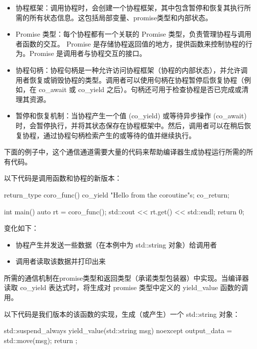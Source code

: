 \begin{itemize}
\item
协程框架：调用协程时，会创建一个协程框架，其中包含暂停和恢复其执行所需的所有状态信息。这包括局部变量、promise类型和内部状态。

\item
Promise 类型：每个协程都有一个关联的 Promise 类型，负责管理协程与调用者函数的交互。 Promise 是存储协程返回值的地方，提供函数来控制协程的行为。Promise 是调用者与协程交互的接口。

\item
协程句柄：协程句柄是一种允许访问协程框架（协程的内部状态），并允许调用者恢复或销毁协程的类型。调用者可以使用句柄在协程暂停后恢复协程（例如，在 co\_await 或 co\_yield 之后）。句柄还可用于检查协程是否已完成或清理其资源。

\item
暂停和恢复机制：当协程产生一个值 (co\_yield) 或等待异步操作 (co\_await) 时，会暂停执行，并将其状态保存在协程框架中。然后，调用者可以在稍后恢复协程，通过协程句柄检索产生的或等待的值并继续执行。
\end{itemize}

下面的例子中，这个通信通道需要大量的代码来帮助编译器生成协程运行所需的所有代码。

以下代码是调用函数和协程的新版本：

\begin{cpp}
return_type coro_func() {
    co_yield "Hello from the coroutine\n"s;
    co_return;
}

int main() {
    auto rt = coro_func();
    std::cout << rt.get() << std::endl;
    return 0;
}
\end{cpp}

变化如下：

\begin{itemize}
\item
协程产生并发送一些数据（在本例中为 std::string 对象）给调用者

\item
调用者读取该数据并打印出来
\end{itemize}

所需的通信机制在promise类型和返回类型（承诺类型包装器）中实现。当编译器读取 co\_yield 表达式时，将生成对 promise 类型中定义的 yield\_value 函数的调用。

以下代码是我们版本的该函数的实现，生成（或产生）一个 std::string 对象：

\begin{cpp}
std::suspend_always yield_value(std::string msg) noexcept {
    output_data = std::move(msg);
    return {};
}
\end{cpp}


